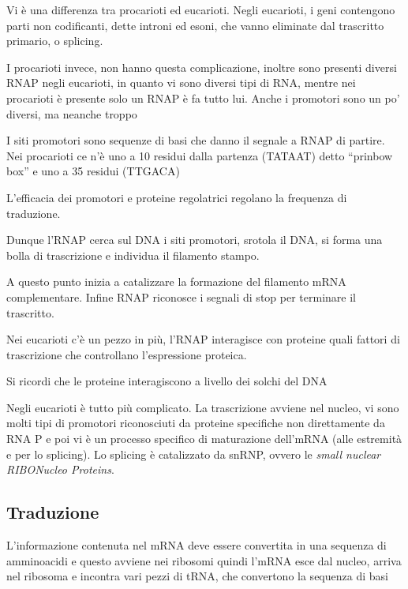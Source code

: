 
Vi è una differenza tra procarioti ed eucarioti.
Negli eucarioti, i geni contengono parti non codificanti, dette introni ed esoni, che vanno eliminate dal trascritto primario, o splicing.


I procarioti invece, non hanno questa complicazione, inoltre sono presenti diversi RNAP negli eucarioti, in quanto vi sono diversi tipi di RNA, mentre nei procarioti è presente solo un RNAP è fa tutto lui. Anche i promotori sono un po' diversi, ma neanche troppo


I siti promotori sono sequenze di basi che danno il segnale a RNAP di partire. Nei procarioti ce n'è uno a 10 residui dalla partenza (TATAAT) detto ``prinbow box'' e uno a 35 residui (TTGACA)

L'efficacia dei promotori e proteine regolatrici regolano la frequenza di traduzione.

Dunque l'RNAP cerca sul DNA i siti promotori, srotola il DNA, si forma una bolla di trascrizione e individua il filamento stampo.

A questo punto inizia a catalizzare la formazione del filamento mRNA complementare. Infine RNAP riconosce i segnali di stop per terminare il trascritto.

Nei eucarioti c'è un pezzo in più, l'RNAP interagisce con proteine quali fattori di trascrizione che controllano l'espressione proteica.

Si ricordi che le proteine interagiscono a livello dei solchi del DNA


Negli eucarioti è tutto più complicato. La trascrizione avviene nel nucleo, vi sono molti tipi di promotori riconosciuti da proteine specifiche non direttamente da RNA P e poi vi è un processo specifico di maturazione dell'mRNA (alle estremità e per lo splicing). Lo splicing è catalizzato da snRNP, ovvero le \emph{small nuclear RIBONucleo Proteins}.


\subsection{Traduzione}

L'informazione contenuta nel mRNA deve essere convertita in una sequenza di amminoacidi e questo avviene nei ribosomi quindi l'mRNA esce dal nucleo, arriva nel ribosoma e incontra vari pezzi di tRNA, che convertono la sequenza di basi

